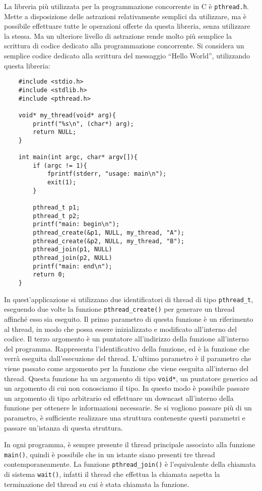 \documentclass{article}
\numberwithin{equation}{subsection}
\begin{document}
La libreria più utilizzata per la programmazione concorrente in C è \verb|pthread.h|. Mette a disposizione delle astrazioni relativamente semplici da utilizzare, ma è possibile effettuare tutte le 
operazioni offerte da questa libreria, senza utilizzare la stessa. Ma un ulteriore livello di astrazione rende molto più semplice la scrittura di codice dedicato alla programmazione concorrente. 
Si considera un semplice codice dedicato alla scrittura del messaggio ``Hello World'', utilizzando questa libreria:
\begin{verbatim}
    #include <stdio.h>
    #include <stdlib.h>
    #include <pthread.h>
    
    void* my_thread(void* arg){
        printf("%s\n", (char*) arg);
        return NULL;
    }

    int main(int argc, char* argv[]){
        if (argc != 1){
            fprintf(stderr, "usage: main\n");
            exit(1);
        }

        pthread_t p1;
        pthread_t p2;
        printf("main: begin\n");
        pthread_create(&p1, NULL, my_thread, "A");
        pthread_create(&p2, NULL, my_thread, "B");
        pthread_join(p1, NULL)
        pthread_join(p2, NULL)
        printf("main: end\n");
        return 0;
    }   
\end{verbatim}

In quest'applicazione si utilizzano due identificatori di thread di tipo \verb|pthread_t|, eseguendo due volte la funzione \verb|pthread_create()| per generare un thread affinché esso sia 
eseguito. Il primo parametro di questa funzione è un riferimento al thread, in modo che possa essere inizializzato e modificato all'interno del codice. Il terzo argomento è un puntatore 
all'indirizzo della funzione all'interno del programma. Rappresenta l'identificativo della funzione, ed è la funzione che verrà eseguita dall'esecuzione del thread. L'ultimo parametro è il 
parametro che viene passato come argomento per la funzione che viene eseguita all'interno del thread. Questa funzione ha un argomento di tipo \verb|void*|, un puntatore generico ad un argomento 
di cui non conosciamo il tipo. In questo modo è possibile passare un argomento di tipo arbitrario ed effettuare un downcast all'interno della funzione per ottenere le informazioni necessarie. 
Se si vogliono passare più di un parametro, è sufficiente realizzare una struttura contenente questi parametri e passare un'istanza di questa struttura. 

In ogni programma, è sempre presente il thread principale associato alla funzione \verb|main()|, quindi è possibile che in un istante siano presenti tre thread contemporaneamente. 
La funzione \verb|pthread_join()| è l'equivalente della chiamata di sistema \verb|wait()|, infatti il thread che effettua la chiamata aspetta la terminazione del thread su 
cui è stata chiamata la funzione. 
\end{document}
